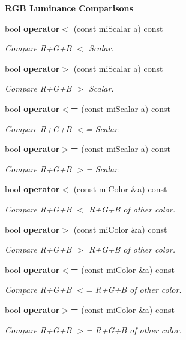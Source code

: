 \begin{Indent}{\bf RGB Luminance Comparisons}\par
\begin{CompactItemize}
\item 
bool {\bf operator$<$} (const mi\-Scalar a) const 
\begin{CompactList}\small\item\em Compare R+G+B $<$ Scalar. \item\end{CompactList}\item 
bool {\bf operator$>$} (const mi\-Scalar a) const 
\begin{CompactList}\small\item\em Compare R+G+B $>$ Scalar. \item\end{CompactList}\item 
bool {\bf operator$<$=} (const mi\-Scalar a) const 
\begin{CompactList}\small\item\em Compare R+G+B $<$= Scalar. \item\end{CompactList}\item 
bool {\bf operator$>$=} (const mi\-Scalar a) const 
\begin{CompactList}\small\item\em Compare R+G+B $>$= Scalar. \item\end{CompactList}\item 
bool {\bf operator$<$} (const mi\-Color \&a) const 
\begin{CompactList}\small\item\em Compare R+G+B $<$ R+G+B of other color. \item\end{CompactList}\item 
bool {\bf operator$>$} (const mi\-Color \&a) const 
\begin{CompactList}\small\item\em Compare R+G+B $>$ R+G+B of other color. \item\end{CompactList}\item 
bool {\bf operator$<$=} (const mi\-Color \&a) const 
\begin{CompactList}\small\item\em Compare R+G+B $<$= R+G+B of other color. \item\end{CompactList}\item 
bool {\bf operator$>$=} (const mi\-Color \&a) const 
\begin{CompactList}\small\item\em Compare R+G+B $>$= R+G+B of other color. \item\end{CompactList}\end{CompactItemize}
\end{Indent}
